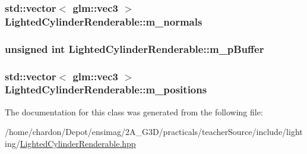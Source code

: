 \hypertarget{classLightedCylinderRenderable_ae5305cb063f670b7c8943423b82f2d1f}{
\subsubsection[{m\+\_\+normals}]{\setlength{\rightskip}{0pt plus 5cm}std\+::vector$<$ glm\+::vec3 $>$ Lighted\+Cylinder\+Renderable\+::m\+\_\+normals\hspace{0.3cm}{\ttfamily [private]}}}\label{classLightedCylinderRenderable_ae5305cb063f670b7c8943423b82f2d1f}
\hypertarget{classLightedCylinderRenderable_abf3d79539f561c684db8394bc489cf38}{
\subsubsection[{m\+\_\+p\+Buffer}]{\setlength{\rightskip}{0pt plus 5cm}unsigned int Lighted\+Cylinder\+Renderable\+::m\+\_\+p\+Buffer\hspace{0.3cm}{\ttfamily [private]}}}\label{classLightedCylinderRenderable_abf3d79539f561c684db8394bc489cf38}
\hypertarget{classLightedCylinderRenderable_af92700359498f5307fb416f641a9015d}{
\subsubsection[{m\+\_\+positions}]{\setlength{\rightskip}{0pt plus 5cm}std\+::vector$<$ glm\+::vec3 $>$ Lighted\+Cylinder\+Renderable\+::m\+\_\+positions\hspace{0.3cm}{\ttfamily [private]}}}\label{classLightedCylinderRenderable_af92700359498f5307fb416f641a9015d}


The documentation for this class was generated from the following file\+:\begin{DoxyCompactItemize}
\item 
/home/chardon/\+Depot/ensimag/2\+A\+\_\+\+G3\+D/practicals/teacher\+Source/include/lighting/\hyperlink{LightedCylinderRenderable_8hpp}{Lighted\+Cylinder\+Renderable.\+hpp}\end{DoxyCompactItemize}
